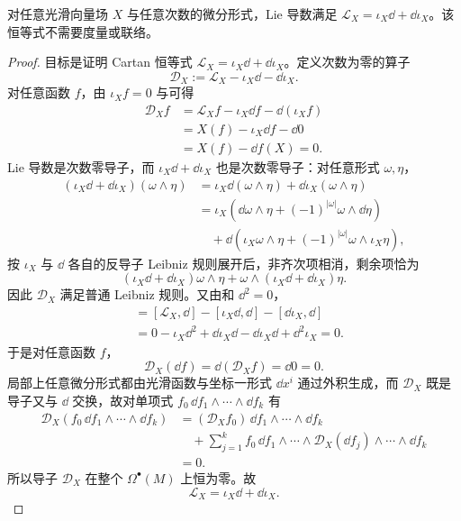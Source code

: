 \begin{theorem}
对任意光滑向量场 $X$ 与任意次数的微分形式，Lie 导数满足 $\mathcal L_X=\iota_X\dd+\dd\iota_X$。该恒等式不需要度量或联络。
\end{theorem}
\begin{proof}
目标是证明 Cartan 恒等式 $\mathcal L_X=\iota_X\dd+\dd\iota_X$。定义次数为零的算子
\begin{equation*}
\mathscr D_X:=\mathcal L_X-\iota_{X}\dd-\dd\iota_{X}.
\end{equation*}
对任意函数 $f$，由 $\iota_{X}f=0$ 与可得
\begin{align*}
\mathscr D_Xf
&=\mathcal L_X f-\iota_{X}\dd f-\dd(\iota_{X}f)\\
&=X(f)-\iota_{X}\dd f-\dd 0\\
&=X(f)-\dd f(X)=0.
\end{align*}
Lie 导数是次数零导子，而 $\iota_{X}\dd+\dd\iota_{X}$ 也是次数零导子：对任意形式 $\omega,\eta$，
\begin{align*}
(\iota_{X}\dd+\dd\iota_{X})(\omega\wedge\eta)
&=\iota_{X}\dd(\omega\wedge\eta)+\dd\iota_{X}(\omega\wedge\eta)\\
&=\iota_{X}(\dd\omega\wedge\eta+(-1)^{|\omega|}\omega\wedge\dd\eta)\\
&\quad+\dd(\iota_{X}\omega\wedge\eta+(-1)^{|\omega|}\omega\wedge\iota_{X}\eta),
\end{align*}
按 $\iota_{X}$ 与 $\dd$ 各自的反导子 Leibniz 规则展开后，非齐次项相消，剩余项恰为
\begin{equation*}
(\iota_{X}\dd+\dd\iota_{X})\omega\wedge\eta
+\omega\wedge(\iota_{X}\dd+\dd\iota_{X})\eta.
\end{equation*}
因此 $\mathscr D_X$ 满足普通 Leibniz 规则。又由和 $\dd^2=0$，
\begin{align*}
[\mathscr D_X,\dd]
&=[\mathcal L_X,\dd]-[\iota_{X}\dd,\dd]-[\dd\iota_{X},\dd]\\
&=0-\iota_{X}\dd^2+\dd\iota_{X}\dd-\dd\iota_{X}\dd+\dd^2\iota_{X}=0.
\end{align*}
于是对任意函数 $f$，
\begin{equation*}
\mathscr D_X(\dd f)=\dd(\mathscr D_X f)=\dd 0=0.
\end{equation*}
局部上任意微分形式都由光滑函数与坐标一形式 $\dd x^i$ 通过外积生成，而 $\mathscr D_X$ 既是导子又与 $\dd$ 交换，故对单项式 $f_0\,\dd f_1\wedge\cdots\wedge\dd f_k$ 有
\begin{align*}
\mathscr D_X(f_0\,\dd f_1\wedge\cdots\wedge\dd f_k)
&=(\mathscr D_X f_0)\,\dd f_1\wedge\cdots\wedge\dd f_k\\
&\quad+\sum_{j=1}^k f_0\,\dd f_1\wedge\cdots\wedge\mathscr D_X(\dd f_j)\wedge\cdots\wedge\dd f_k\\
&=0.
\end{align*}
所以导子 $\mathscr D_X$ 在整个 $\Omega^\bullet(M)$ 上恒为零。故
\begin{equation}\label{eq:math-dg-synthesis-cartan}
{\mathcal L_X=\iota_{X}\dd+\dd\iota_{X}.}
\end{equation}
\end{proof}
